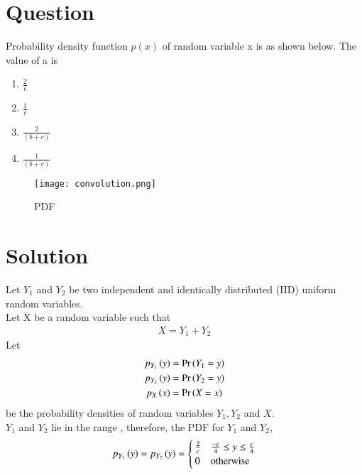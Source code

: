 \documentclass[journal,12pt,twocolumn]{IEEEtran}
\begin{document}
\section*{Question}
Probability density function $p(x)$ of random variable x is as shown below. The value of a is
\begin{enumerate}[label=\Alph*)]
    \item $\frac{2}{c}$
    \item $\frac{1}{c}$
    \item $\frac{2}{(b+c)}$
    \item $\frac{1}{(b+c)}$
\end{enumerate}
\begin{figure}[h!]
\centering
\texttt{[image: convolution.png]}
\caption{PDF}
\label{fig:BSC}
\end{figure}
\section*{Solution}

Let $Y_1$ and $Y_2$ be two independent and identically distributed (IID) uniform random variables.\\
Let X be a random variable such that
\begin{align}
    X = Y_1 + Y_2
\end{align}
Let
\begin{align}
    p_{Y_1}\left(y\right) &= \Pr\left(Y_1=y\right) \\
    p_{Y_2}\left(y\right) &= \Pr\left(Y_2=y\right) \\
    p_X\left(x\right) &= \Pr\left(X=x\right)
\end{align}
be the probability densities of random variables $Y_1, Y_2$ and $X$. \\
$Y_1$ and $Y_2$ lie in the range , therefore, the PDF for $Y_1$ and $Y_2$,
\begin{align}
p_{Y_1}\left(y\right) = p_{Y_2}\left(y\right) = 
\begin{cases}
\frac{2}{c} &  \frac{-c}{4} \le y \le \frac{c}{4}\\
0 & \text{otherwise}
\end{cases}
\end{align}
\end{document}
